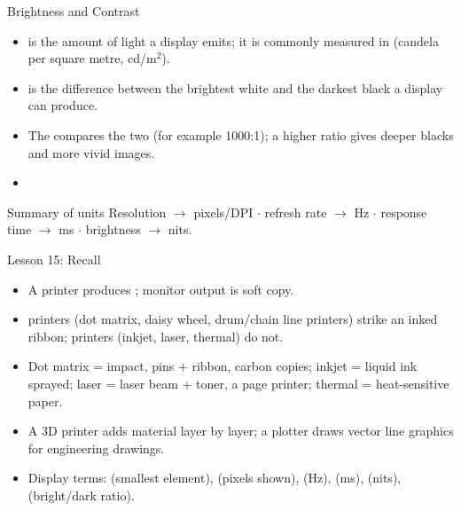 \documentclass[aspectratio=169]{beamer}
\begin{document}
\begin{frame}{Brightness and Contrast}
  \begin{itemize}
    \item {} is the amount of light a display emits; it is
      commonly measured in  (candela per square metre, cd/m$^2$).
    \item {} is the difference between the brightest white and
      the darkest black a display can produce.
    \item The  compares the two (for example 1000:1);
      a higher ratio gives deeper blacks and more vivid images.
    \item {}
  \end{itemize}
  \begin{block}{Summary of units}
    Resolution $\rightarrow$ pixels/DPI \;$\cdot$\; refresh rate $\rightarrow$
    Hz \;$\cdot$\; response time $\rightarrow$ ms \;$\cdot$\;
    brightness $\rightarrow$ nits.
  \end{block}
\end{frame}

\begin{frame}{Lesson 15: Recall}
  \begin{itemize}
    \item A printer produces ; monitor output is soft copy.
    \item {} printers (dot matrix, daisy wheel, drum/chain line
      printers) strike an inked ribbon;  printers (inkjet,
      laser, thermal) do not.
    \item Dot matrix = impact, pins + ribbon, carbon copies; inkjet =
      liquid ink sprayed; laser = laser beam + toner, a page printer;
      thermal = heat-sensitive paper.
    \item A 3D printer adds material layer by layer; a plotter draws vector
      line graphics for engineering drawings.
    \item Display terms:  (smallest element), 
      (pixels shown),  (Hz),  (ms),
       (nits),  (bright/dark ratio).
  \end{itemize}
\end{frame}
\end{document}
